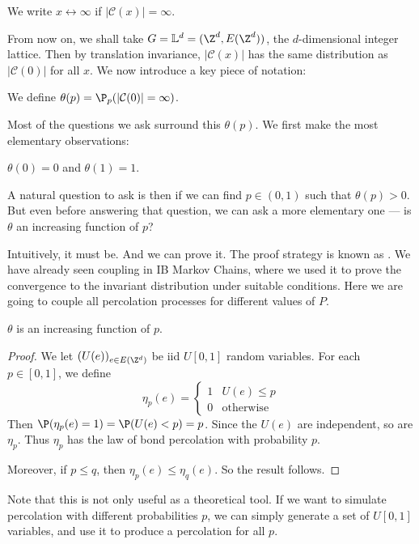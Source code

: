 \documentclass[a4paper]{article}
\renewcommand\L{\mathbb{L}}
\begin{document}
\begin{notation}
  We write $x \leftrightarrow \infty$ if $|\mathcal{C}(x)| = \infty$.
\end{notation}

From now on, we shall take $G = \L^d = (\Z^d, E(\Z^d))$, the $d$-dimensional integer lattice.\index{$\L^d$} Then by translation invariance, $|\mathcal{C}(x)|$ has the same distribution as $|\mathcal{C}(0)|$ for all $x$. We now introduce a key piece of notation:
\begin{defi}[$\theta(p)$]
  We define $\theta(p) = \P_p(|\mathcal{C}(0)| = \infty)$.
\end{defi}

Most of the questions we ask surround this $\theta(p)$. We first make the most elementary observations:
\begin{eg}
  $\theta(0) = 0$ and $\theta(1) = 1$.
\end{eg}

A natural question to ask is then if we can find $p \in (0, 1)$ such that $\theta(p) > 0$. But even before answering that question, we can ask a more elementary one --- is $\theta$ an increasing function of $p$?

Intuitively, it must be. And we can prove it. The proof strategy is known as . We have already seen coupling in IB Markov Chains, where we used it to prove the convergence to the invariant distribution under suitable conditions. Here we are going to couple all percolation processes for different values of $P$.

\begin{lemma}
  $\theta$ is an increasing function of $p$.
\end{lemma}

\begin{proof}
  We let $(U(e))_{e \in E(\Z^d)}$ be iid $U[0, 1]$ random variables. For each $p \in [0, 1]$, we define
  \[
    \eta_p(e) =
    \begin{cases}
      1 & U(e) \leq p\\
      0 & \text{otherwise}
    \end{cases}
  \]
  Then $\P(\eta_p(e) = 1) = \P(U(e) < p) = p$. Since the $U(e)$ are independent, so are $\eta_p$. Thus $\eta_p$ has the law of bond percolation with probability $p$.

  Moreover, if $p \leq q$, then $\eta_p(e) \leq \eta_q(e)$. So the result follows.
\end{proof}
Note that this is not only useful as a theoretical tool. If we want to simulate percolation with different probabilities $p$, we can simply generate a set of $U[0, 1]$ variables, and use it to produce a percolation for all $p$.
\end{document}
